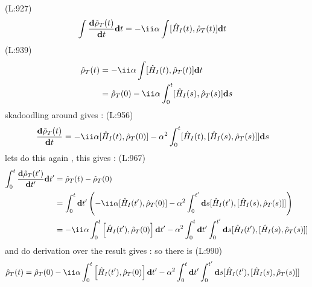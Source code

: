 (L:927)
\begin{equation}
\begin{split}
\int \dfrac{\bold{d}\hat{\rho }_{T }(t )}{\bold{d}t }\bold{d}t &=-\ii \alpha \int [\hat{H }_{I }(t ),\hat{\rho }_{T }(t )]\bold{d}t \end{split}
\end{equation}
(L:939)
\begin{equation}
\begin{split}
\hat{\rho }_{T }(t )&=-\ii \alpha \int [\hat{H }_{I }(t ),\hat{\rho }_{T }(t )]\bold{d}t \\
&=\hat{\rho }_{T }(0)-\ii \alpha \int _{0}^{t }[\hat{H }_{I }(s ),\hat{\rho }_{T }(s )]\bold{d}s \end{split}
\end{equation}
 skadoodling around gives : 
(L:956)
\begin{equation}
\begin{split}
\dfrac{\bold{d}\hat{\rho }_{T }(t )}{\bold{d}t }&=-\ii \alpha [\hat{H }_{I }(t ),\hat{\rho }_{T }(0)]-\alpha ^{2}\int _{0}^{t }[\hat{H }_{I }(t ),[\hat{H }_{I }(s ),\hat{\rho }_{T }(s )]]\bold{d}s \end{split}
\end{equation}
 lets do this again , this gives :  
(L:967)
\begin{equation}
\begin{split}
\int _{0}^{t }\dfrac{\bold{d}\hat{\rho }_{T }(t ')}{\bold{d}t '}\bold{d}t '&=\hat{\rho }_{T }(t )-\hat{\rho }_{T }(0)\\
&=\int _{0}^{t }\bold{d}t '\left(-\ii \alpha [\hat{H }_{I }(t '),\hat{\rho }_{T }(0)]-\alpha ^{2}\int _{0}^{t '}\bold{d}s [\hat{H }_{I }(t '),[\hat{H }_{I }(s ),\hat{\rho }_{T }(s )]]\right)\\
&=-\ii \alpha \int _{0}^{t }\left[\hat{H }_{I }(t '),\hat{\rho }_{T }(0)\right]\bold{d}t '-\alpha ^{2}\int _{0}^{t }\bold{d}t '\int _{0}^{t '}\bold{d}s [\hat{H }_{I }(t '),[\hat{H }_{I }(s ),\hat{\rho }_{T }(s )]]\end{split}
\end{equation}
 and do derivation over the result gives : 
 so there is 
(L:990)
\begin{equation}
\begin{split}
\hat{\rho }_{T }(t )&=\hat{\rho }_{T }(0)-\ii \alpha \int _{0}^{t }\left[\hat{H }_{I }(t '),\hat{\rho }_{T }(0)\right]\bold{d}t '-\alpha ^{2}\int _{0}^{t }\bold{d}t '\int _{0}^{t '}\bold{d}s [\hat{H }_{I }(t '),[\hat{H }_{I }(s ),\hat{\rho }_{T }(s )]]\end{split}
\end{equation}
